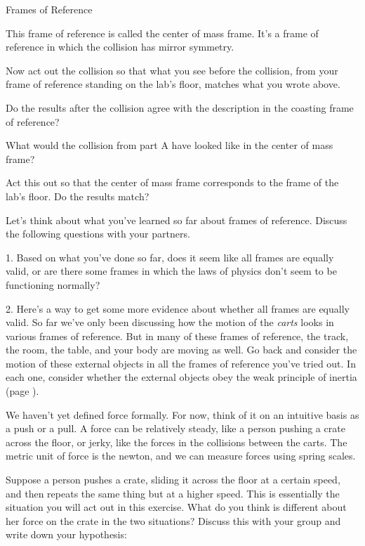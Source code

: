 \begin{lab}{Frames of Reference}
\spaceforwriting

This frame of reference is called the
center of mass frame. It's a frame of reference in which the collision has mirror
symmetry.

Now act out the collision so that what you see before the collision, from your frame of reference standing
on the lab's floor, matches what you wrote above.

Do the results after the collision agree with the description in the coasting frame of reference?

\onelineforwriting


What would the collision from part A have looked like in the center of mass frame?

\spaceforwriting

Act this out so that the center of mass frame corresponds to the frame of the lab's
floor. Do the results match?


Let's think about what you've learned so far about frames of reference. Discuss the following
questions with your partners.

1. Based on what you've done so far, does it seem like all frames are equally valid, or
are there some frames in which the laws of physics don't seem to be functioning normally?

2. Here's a way to get some more evidence about whether all frames are equally valid.
So far we've only been discussing how the motion of the \emph{carts} looks in various frames
of reference. But in many of these frames of reference, the track, the room, the table, and
your body are moving as well. Go back and consider the motion of these external objects
in all the frames of reference you've
tried out. In each one, consider whether the external objects obey the weak principle
of inertia (page \pageref{weak-principle-of-inertia}).


We haven't yet defined force formally. For now, think of it on an intuitive basis as a push
or a pull. A force can be relatively steady, like a person pushing a crate across the floor, or jerky, like the forces
in the collisions between the carts. The metric unit of force is the newton, and we can measure
forces using spring scales.

Suppose a person pushes a crate, sliding it across the floor at a certain speed, and then repeats the same
 thing but at a higher speed. This is essentially the situation you will act out in this exercise. What
 do you think is different about her force on the crate in the two situations? Discuss this with your group and
 write down your hypothesis:


\end{lab}

